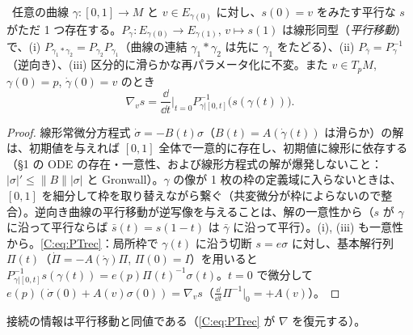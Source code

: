 \begin{thm}[平行移動]\label{C:thm:PT}\tP\
任意の曲線 $\gamma:[0,1]\to M$ と $v\in E_{\gamma(0)}$ に対し、$s(0)=v$ をみたす平行な $s$ がただ 1 つ存在する。$P_\gamma:E_{\gamma(0)}\to E_{\gamma(1)}$, $v\mapsto s(1)$ は線形同型（\emph{平行移動}）で、(i) $P_{\gamma_1*\gamma_2}=P_{\gamma_2}P_{\gamma_1}$（曲線の連結 $\gamma_1*\gamma_2$ は先に $\gamma_1$ をたどる）、(ii) $P_{\bar\gamma}=P_\gamma^{-1}$（逆向き）、(iii) 区分的に滑らかな再パラメータ化に不変。また $v\in T_pM$, $\gamma(0)=p$, $\dot\gamma(0)=v$ のとき
\begin{equation}\label{C:eq:PTrec}
\nabla_vs=\frac{\dd}{\dd t}\Big|_{t=0}P_{\gamma|[0,t]}^{-1}\bigl(s(\gamma(t))\bigr).
\end{equation}
\end{thm}
\begin{proof}
線形常微分方程式 $\dot\sigma=-B(t)\sigma$（$B(t)=A(\dot\gamma(t))$ は滑らか）の解は、初期値を与えれば $[0,1]$ 全体で一意的に存在し、初期値に線形に依存する（§1 の ODE の存在・一意性、および線形方程式の解が爆発しないこと：$|\sigma|'\le\|B\||\sigma|$ と Gronwall）。$\gamma$ の像が 1 枚の枠の定義域に入らないときは、$[0,1]$ を細分して枠を取り替えながら繋ぐ（共変微分が枠によらないので整合）。逆向き曲線の平行移動が逆写像を与えることは、解の一意性から（$s$ が $\gamma$ に沿って平行ならば $\bar s(t)=s(1-t)$ は $\bar\gamma$ に沿って平行）。(i), (iii) も一意性から。\eqref{C:eq:PTrec}：局所枠で $\gamma(t)$ に沿う切断 $s=e\sigma$ に対し、基本解行列 $\Pi(t)$（$\dot\Pi=-A(\dot\gamma)\Pi$, $\Pi(0)=I$）を用いると $P^{-1}_{\gamma|[0,t]}s(\gamma(t))=e(p)\Pi(t)^{-1}\sigma(t)$。$t=0$ で微分して $e(p)(\dot\sigma(0)+A(v)\sigma(0))=\nabla_vs$（$\frac{\dd}{\dd t}\Pi^{-1}|_0=+A(v)$）。
\end{proof}
接続の情報は平行移動と同値である（\eqref{C:eq:PTrec} が $\nabla$ を復元する）。

